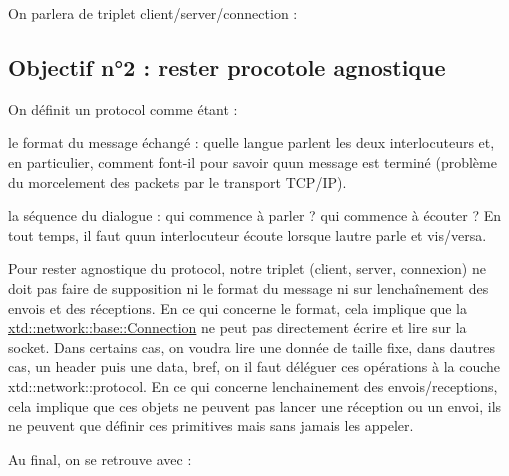On parlera de triplet client/server/connection \+: \hypertarget{index_ssec_design_obj2}{}\subsection{Objectif n°2 \+: rester procotole agnostique}\label{index_ssec_design_obj2}
On définit un protocol comme étant \+:
\begin{DoxyItemize}
\item le format du message échangé \+: quelle langue parlent les deux interlocuteurs et, en particulier, comment font-\/il pour savoir qu\textquotesingle{}un message est terminé (problème du morcelement des packets par le transport T\+C\+P/\+IP).
\item la séquence du dialogue \+: qui commence à parler ? qui commence à écouter ? En tout temps, il faut qu\textquotesingle{}un interlocuteur écoute lorsque l\textquotesingle{}autre parle et vis/versa.
\end{DoxyItemize}

Pour rester agnostique du protocol, notre triplet (client, server, connexion) ne doit pas faire de supposition ni le format du message ni sur l\textquotesingle{}enchaînement des envois et des réceptions. En ce qui concerne le format, cela implique que la \hyperlink{classxtd_1_1network_1_1base_1_1Connection}{xtd\+::network\+::base\+::\+Connection} ne peut pas directement écrire et lire sur la socket. Dans certains cas, on voudra lire une donnée de taille fixe, dans d\textquotesingle{}autres cas, un header puis une data, bref, on il faut déléguer ces opérations à la couche xtd\+::network\+::protocol. En ce qui concerne l\textquotesingle{}enchainement des envois/receptions, cela implique que ces objets ne peuvent pas lancer une réception ou un envoi, ils ne peuvent que définir ces primitives mais sans jamais les appeler.

Au final, on se retrouve avec \+:


